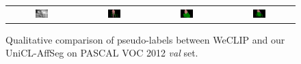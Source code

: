 \begin{figure}[ht]
\begin{tcolorbox}[colframe=black!60, colback=white, boxrule=0.8pt, arc=2pt, left=2pt, right=2pt, top=2pt, bottom=2pt]
\begin{tabular}{cccc}
      \includegraphics[width=0.20\textwidth,height=0.20\textwidth]
      {figures/originals/2011_000453.jpg}
                &
      \includegraphics[width=0.20\textwidth,height=0.20\textwidth]
      {figures/colored_gts/2011_000453.png}
                &
      \includegraphics[width=0.20\textwidth,height=0.20\textwidth]
      {figures/val_labels/weclip/2011_000453_[1, 4, 14].png}
                &
      \includegraphics[width=0.20\textwidth,height=0.20\textwidth]
      {figures/val_labels/ours/2011_000453_[1, 4, 14].png} \\
    \end{tabular}

    \caption{Qualitative comparison of pseudo-labels between WeCLIP and our UniCL-AffSeg on PASCAL VOC 2012 \textit{val} set.}
    \label{fig:qualitative_comparison_pseudolabel_val}
  \end{tcolorbox}
\end{figure}





